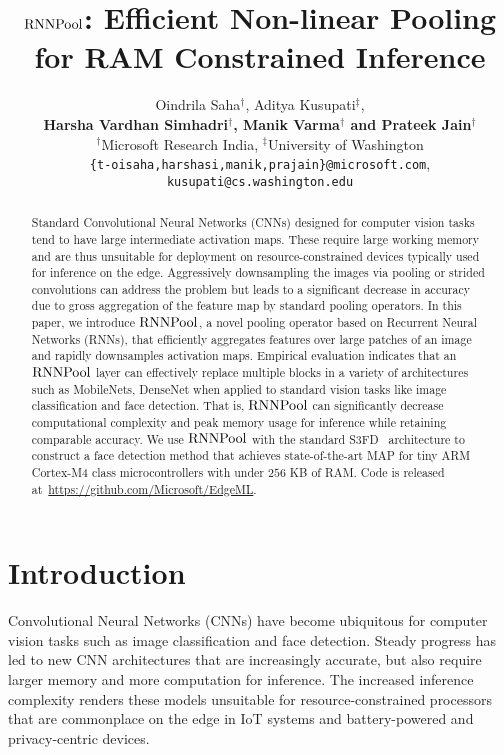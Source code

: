 \documentclass[10pt]{article}
\newcommand{\rpool}{\ensuremath{{\rm RNNPool}}\xspace}
\begin{document}
\title{\rpool: Efficient Non-linear Pooling for RAM Constrained Inference}
\author{
Oindrila Saha$^\dagger$, Aditya Kusupati$^\ddagger$, \\\textbf{Harsha Vardhan Simhadri$^\dagger$, Manik Varma$^\dagger$ and Prateek Jain$^\dagger$}\\
$^\dagger$Microsoft Research India, 
$^\ddagger$University of Washington\\
\texttt{\{t-oisaha,harshasi,manik,prajain\}@microsoft.com}, \texttt{kusupati@cs.washington.edu}
}


\maketitle
\begin{abstract}
Standard Convolutional Neural Networks (CNNs) designed for computer
vision tasks tend to have large intermediate activation maps. These
require large working memory and are thus unsuitable for deployment on
resource-constrained devices typically used for inference on the
edge. Aggressively downsampling the images via pooling or strided
convolutions can address the problem but leads to a significant
decrease in accuracy due to gross aggregation of the feature map by
standard pooling operators. In this paper, we introduce \rpool, a
novel pooling operator based on Recurrent Neural Networks (RNNs), that
efficiently aggregates features over large patches of an image and
rapidly downsamples activation maps.  Empirical evaluation indicates
that an \rpool layer can effectively replace multiple blocks in a
variety of architectures such as
MobileNets,
DenseNet when applied to standard vision
tasks like image classification and face detection. That is, \rpool
can significantly decrease computational complexity and peak memory
usage for inference while retaining comparable accuracy. We use \rpool
with the standard S3FD~\citep{zhang2017s3fd} architecture to construct
a face detection method that achieves state-of-the-art MAP for tiny
ARM Cortex-M4 class microcontrollers with under $256$ KB of
RAM. Code is released at~\url{https://github.com/Microsoft/EdgeML}.
\end{abstract}
  \section{Introduction}
\label{sec:intro}

Convolutional Neural Networks (CNNs) have become ubiquitous for
computer vision tasks such as image classification and face
detection. Steady progress has led to new CNN architectures that are
increasingly accurate, but also require larger memory and more
computation for inference. The increased inference complexity renders
these models unsuitable for resource-constrained processors that are
commonplace on the edge in IoT systems and battery-powered and
privacy-centric devices.
\end{document}
